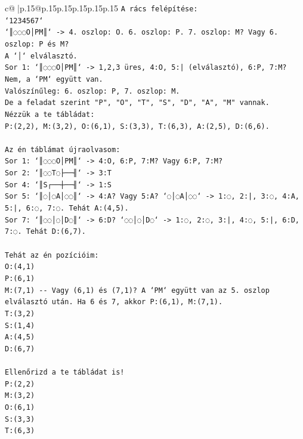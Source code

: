\documentclass{article}
\begin{document}
{\begin{supertabular}{c@{$\;$}|p{.15\linewidth}@{}p{.15\linewidth}p{.15\linewidth}p{.15\linewidth}p{.15\linewidth}p{.15\linewidth}}
{{{\texttt{A rács felépítése:} \\
\texttt{`1234567`} \\
\texttt{`║◌◌◌O│PM║` {-}> 4. oszlop: O. 6. oszlop: P. 7. oszlop: M? Vagy 6. oszlop: P és M?} \\
\texttt{A `│` elválasztó.} \\
\texttt{Sor 1: `║◌◌◌O│PM║` {-}> 1,2,3 üres, 4:O, 5:| (elválasztó), 6:P, 7:M? Nem, a `PM` együtt van.} \\
\texttt{Valószínűleg: 6. oszlop: P, 7. oszlop: M.} \\
\texttt{De a feladat szerint "P", "O", "T", "S", "D", "A", "M" vannak.} \\
\texttt{Nézzük a te tábládat:} \\
\texttt{P:(2,2), M:(3,2), O:(6,1), S:(3,3), T:(6,3), A:(2,5), D:(6,6).} \\
\\ 
\texttt{Az én táblámat újraolvasom:} \\
\texttt{Sor 1: `║◌◌◌O│PM║` {-}> 4:O, 6:P, 7:M? Vagy 6:P, 7:M?} \\
\texttt{Sor 2: `║◌◌T◌├──╢` {-}> 3:T} \\
\texttt{Sor 4: `║S┌──┼──╢` {-}> 1:S} \\
\texttt{Sor 5: `║◌│◌A│◌◌║` {-}> 4:A? Vagy 5:A? `◌│◌A│◌◌` {-}> 1:◌, 2:|, 3:◌, 4:A, 5:|, 6:◌, 7:◌. Tehát A:(4,5).} \\
\texttt{Sor 7: `║◌◌│◌│D◌║` {-}> 6:D? `◌◌│◌│D◌` {-}> 1:◌, 2:◌, 3:|, 4:◌, 5:|, 6:D, 7:◌. Tehát D:(6,7).} \\
\\ 
\texttt{Tehát az én pozícióim:} \\
\texttt{O:(4,1)} \\
\texttt{P:(6,1)} \\
\texttt{M:(7,1) {-}{-} Vagy (6,1) és (7,1)? A `PM` együtt van az 5. oszlop elválasztó után. Ha 6 és 7, akkor P:(6,1), M:(7,1).} \\
\texttt{T:(3,2)} \\
\texttt{S:(1,4)} \\
\texttt{A:(4,5)} \\
\texttt{D:(6,7)} \\
\\ 
\texttt{Ellenőrizd a te tábládat is!} \\
\texttt{P:(2,2)} \\
\texttt{M:(3,2)} \\
\texttt{O:(6,1)} \\
\texttt{S:(3,3)} \\
\texttt{T:(6,3)} \\
}}}
\end{supertabular}}
\end{document}
